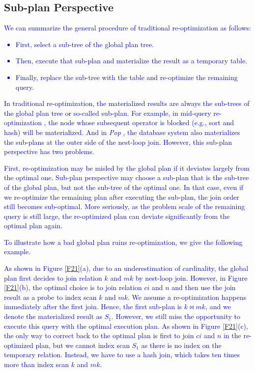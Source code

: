 \subsection{Sub-plan Perspective} \label{S23}
\textcolor{blue}{
    We can summarize the general procedure of traditional re-optimization as follows:
    \begin{itemize}[leftmargin = 15pt]
        \item First, select a sub-tree of the global plan tree.
        \item Then, execute that sub-plan and materialize the result as a temporary table.
        \item Finally, replace the sub-tree with the table and re-optimize the remaining query.
    \end{itemize}
}\par
\textcolor{blue}{
    In traditional re-optimization, the materialized results are always the sub-trees of the global plan tree or so-called sub-plan. For example, in mid-query re-optimization \cite{Reopt}, the node whose subsequent operator is blocked (e.g., sort and hash) will be materialized. And in \textit{Pop} \cite{Pop}, the database system also materializes the sub-plans at the outer side of the nest-loop join. However, this sub-plan perspective has two problems.
}\par
\textcolor{blue}{
    First, re-optimization may be misled by the global plan if it deviates largely from the optimal one. Sub-plan perspective may choose a sub-plan that is the sub-tree of the global plan, but not the sub-tree of the optimal one. In that case, even if we re-optimize the remaining plan after executing the sub-plan, the join order still becomes sub-optimal. More seriously, as the problem scale of the remaining query is still large, the re-optimized plan can deviate significantly from the optimal plan again.
}\par
\textcolor{blue}{
    To illustrate how a bad global plan ruins re-optimization, we give the following example.
    \begin{Example}
        As shown in Figure \ref{F21}(a), due to an underestimation of cardinality, the global plan first decides to join relation $k$ and $mk$ by nest-loop join. However, in Figure \ref{F21}(b), the optimal choice is to join relation $ci$ and $n$ and then use the join result as a probe to index scan $k$ and $mk$. We assume a re-optimization happens immediately after the first join. Hence, the first sub-plan is $k \bowtie mk$, and we denote the materialized result as $S_1$. However, we still miss the opportunity to execute this query with the optimal execution plan. As shown in Figure \ref{F21}(c), the only way to correct back to the optimal plan is first to join $ci$ and $n$ in the re-optimized plan, but we cannot index scan $S_1$ as there is no index on the temporary relation. Instead, we have to use a hash join, which takes ten times more than index scan $k$ and $mk$.
    \end{Example}
}\par
